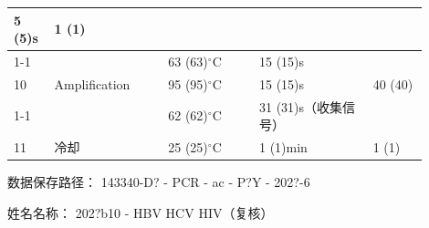 \documentclass[UTF8,10pt,a4paper,fontset=fandol]{ctexart}
\newcommand{\fieldvalue}[1]{#1}
\newcommand{\handwritten}[1]{#1}
\begin{document}
\begin{tabular}{|p{0.08\linewidth}|p{0.25\linewidth}|p{0.20\linewidth}|p{0.25\linewidth}|p{0.12\linewidth}|}
\fieldvalue{\handwritten{5}} (5)s &
\fieldvalue{\handwritten{1}} (1)
\\ \cline{1-1}\cline{3-5}
& &
\fieldvalue{\handwritten{63}} (63)$^\circ$C &
\fieldvalue{\handwritten{15}} (15)s &
\\ \hline
10 & Amplification &
\fieldvalue{\handwritten{95}} (95)$^\circ$C &
\fieldvalue{\handwritten{15}} (15)s &
\fieldvalue{\handwritten{40}} (40)
\\ \cline{1-1}\cline{3-5}
& &
\fieldvalue{\handwritten{62}} (62)$^\circ$C &
\fieldvalue{\handwritten{31}} (31)s（收集信号） &
\\ \hline
11 & 冷却 &
\fieldvalue{\handwritten{25}} (25)$^\circ$C &
\fieldvalue{\handwritten{1}} (1)min &
\fieldvalue{\handwritten{1}} (1)
\\ \hline
\end{tabular}

\medskip
数据保存路径：%
\fieldvalue{\handwritten{143340-D? - PCR - ac - P?Y - 202?-6}}

姓名名称：%
\fieldvalue{\handwritten{202?b10 - HBV HCV HIV（复核）}}
\end{document}
